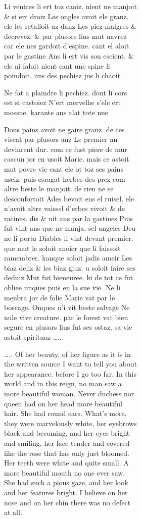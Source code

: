 \documentclass[
  letterpaper,
  DIV=11,
  numbers=noendperiod,
  oneside]{scrreprt}
\begin{document}
\begin{figure}
\begin{figure}
\begin{figure}
\begin{minipage}{0.20\linewidth}
{Li ventres li ert toz caoiz.} {nient ne manjoit \& si ert droiz} {Les
ongles avoit ele granz.} {ele les retalloit az danz} Les piez maigres \&
decrevez. \& par plusors lius mut navrez car ele nes gardoit d'espine.
cant el aloit par le gastine Ans li ert vis son escient. \& ele ni
faloit nient {cant une spine li poindoit.} {uns des pechiez jus li
chaoit}

{Ne fat a plaindre li pechiez.} {dont li cors est si castoiez} {N'ert
mervelhe s'ele ert mossue.} {karante ans alat tote nue}

Dous pains avoit ne gaire granz. de ces viscat par plusors anz Le
premier an devinrent dur. com ce fust piere de mur cascun jor en usoit
Marie. mais ce astoit mut {povre vie} cant ele ot toz ses pains useiz.
puis esragat herbes des prez com altre beste le manjoit. de rien ne se
desconfortoit Ades bevoit ens el ruisel. ele n'avoit altre vaissel
d'erbes vivoit \& de racines. dis \& uit ans par la gastines Puis fut
vint ans que ne manja. sel angeles Deu ne li porta Diables li vint
devant premier. que mut le soloit {anoier} que li faissoit ramembrer.
kanque soloit jadis ameir Les biaz deliz \& les biaz {giuz.} u soloit
faire ses {deduiz} Mut fut bieneuree. ki de tot ce fut obliee unques
puis en la sue vie. Ne li menbra jor de folie Marie vat par le boscage.
Onques n'i vit beste salvage Ne nule vive creature. par le forest vat
bien segure en plusors lius fut ses ostaz. sa vie astoit spirituaz
\ldots..

\ldots.. Of her beauty, of her figure as it is in the written source I
want to tell you about her appearance. before I go too far. In this
world and in this reign, no man saw a more beautiful woman. Never
duchess nor queen had on her head more beautiful hair. She had round
ears. What's more, they were marvelously {white}, her eyebrows {black}
and becoming, and her eyes {bright} and smiling, {her face tender and
{covered}} {{like the rose that has only just bloomed}.} {Her teeth were
{white} and quite small.} {A more beautiful mouth no one ever saw.} {She
had such a pious gaze,} {and her look and her features {bright}.} {I
believe on her nose and on her chin} {there was no defect at all.}


\end{minipage}
\end{figure}
\end{figure}
\end{figure}
\end{document}
